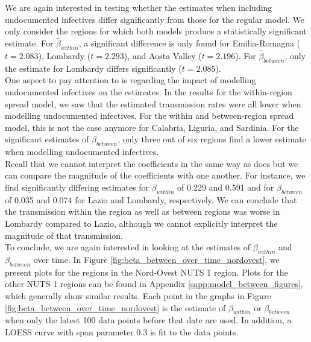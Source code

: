 \documentclass[12pt]{article}
\begin{document}
	We are again interested in testing whether the estimates when including undocumented infectives differ significantly from those for the regular model. We only consider the regions for which both models produce a statistically significant estimate. For $\widehat{\beta}_{within}$, a significant difference is only found for Emilia-Romagna ($t=2.083$), Lombardy ($t=2.293$), and Aosta Valley ($t=2.196$). For $\widehat{\beta}_{between}$, only the estimate for Lombardy differs significantly ($t=2.085$).
	\\
	
	One aspect to pay attention to is regarding the impact of modelling undocumented infectives on the estimates. In the results for the within-region spread model, we saw that the estimated transmission rates were all lower when modelling undocumented infectives. For the within and between-region spread model, this is not the case anymore for Calabria, Liguria, and Sardinia. For the significant estimates of $\beta_{between}$, only three out of six regions find a lower estimate when modelling undocumented infectives.
	\\
	
	Recall that we cannot interpret the coefficients in the same way as \textcite{adda2016economic} does but we can compare the magnitude of the coefficients with one another. For instance, we find significantly differing estimates for $\beta_{within}$ of 0.229 and 0.591 and for $\beta_{between}$ of 0.035 and 0.074 for Lazio and Lombardy, respectively. We can conclude that the transmission within the region as well as between regions was worse in Lombardy compared to Lazio, although we cannot explicitly interpret the magnitude of that transmission.
	\\
    
    To conclude, we are again interested in looking at the estimates of $\beta_{within}$ and $\beta_{between}$ over time. In Figure \ref{fig:beta_between_over_time_nordovest}, we present plots for the regions in the Nord-Ovest NUTS 1 region. Plots for the other NUTS 1 regions can be found in Appendix \ref{sapp:model_between_figures}, which generally show similar results. Each point in the graphs in Figure \ref{fig:beta_between_over_time_nordovest} is the estimate of $\beta_{within}$ or $\beta_{between}$ when only the latest 100 data points before that date are used. In addition, a LOESS curve with span parameter 0.3 is fit to the data points.
    
\end{document}
